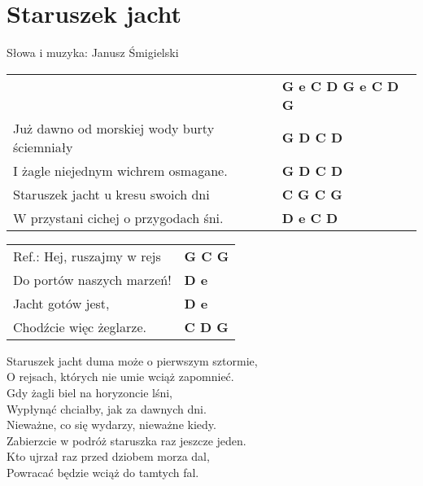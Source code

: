 \section{Staruszek jacht}

Słowa i muzyka: Janusz Śmigielski\\

\vspace{2em}
\begin{tabular}{@{}p{8cm}@{}l@{}}
& \bfseries G e C D G e C D G \\
Już dawno od morskiej wody burty ściemniały  & \bfseries   G D C D \\
I żagle niejednym wichrem osmagane.  & \bfseries   G D C D \\
Staruszek jacht u kresu swoich dni  & \bfseries   C G C G \\
W przystani cichej o przygodach śni.  & \bfseries   D e C D \\
\end{tabular}

\vspace{1em}
\begin{tabular}{@{}p{8cm}@{}l@{}}
Ref.: Hej, ruszajmy w rejs  & \bfseries   G C G \\
Do portów naszych marzeń!  & \bfseries   D e \\
Jacht gotów jest,  & \bfseries   D e \\
Chodźcie więc żeglarze.  & \bfseries   C D G \\
\end{tabular}

\vspace{1em}
Staruszek jacht duma może o pierwszym sztormie, \\
O rejsach, których nie umie wciąż zapomnieć. \\
Gdy żagli biel na horyzoncie lśni, \\
Wypłynąć chciałby, jak za dawnych dni. \\

Nieważne, co się wydarzy, nieważne kiedy. \\
Zabierzcie w podróż staruszka raz jeszcze jeden. \\
Kto ujrzał raz przed dziobem morza dal, \\
Powracać będzie wciąż do tamtych fal.